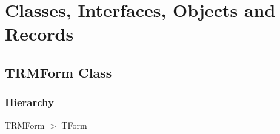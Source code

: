 \documentclass{report}
\newif\ifpdf
\begin{document}
\section{Classes, Interfaces, Objects and Records}
\ifpdf
\subsection*{\large{\textbf{TRMForm Class}}\normalsize\hspace{1ex}\hrulefill}
\else
\subsection*{TRMForm Class}
\fi
\label{uninstall.TRMForm}
\subsubsection*{\large{\textbf{Hierarchy}}\normalsize\hspace{1ex}\hfill}
TRMForm {$>$} TForm
\end{document}
